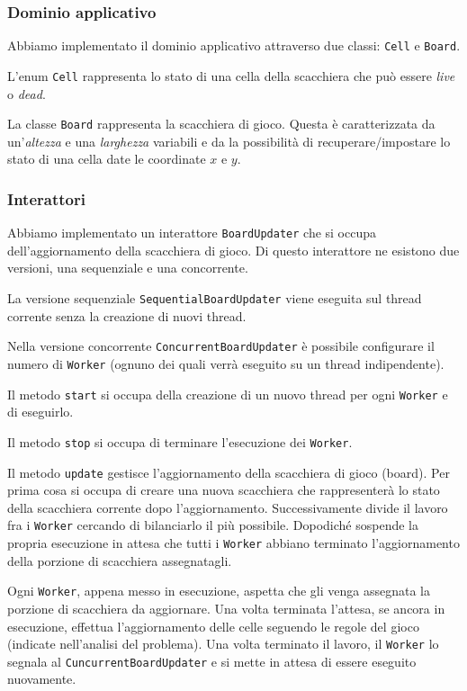 \documentclass[a4paper]{article}
\begin{document}
\subsubsection{Dominio applicativo}\label{dominio-applicativo}

Abbiamo implementato il dominio applicativo attraverso due classi:
\texttt{Cell} e \texttt{Board}.

L'enum \texttt{Cell} rappresenta lo stato di una cella della scacchiera che può essere \emph{live} o \emph{dead}.

La classe \texttt{Board} rappresenta la scacchiera di gioco. Questa è
caratterizzata da un'\emph{altezza} e una \emph{larghezza} variabili e da la possibilità di recuperare/impostare lo stato di una cella date le coordinate $x$ e $y$.

\subsubsection{Interattori}\label{interattori}

Abbiamo implementato un interattore \texttt{BoardUpdater} che si occupa dell'aggiornamento della scacchiera di gioco. Di questo interattore ne esistono due versioni, una sequenziale e una concorrente.

La versione sequenziale \texttt{SequentialBoardUpdater} viene eseguita sul thread corrente senza la creazione di nuovi thread.

Nella versione concorrente \texttt{ConcurrentBoardUpdater} è possibile configurare il numero di \texttt{Worker} (ognuno dei quali verrà
eseguito su un thread indipendente).

Il metodo \texttt{start} si occupa della creazione di un nuovo thread
per ogni \texttt{Worker} e di eseguirlo.

Il metodo \texttt{stop} si occupa di terminare l'esecuzione dei
\texttt{Worker}.

Il metodo \texttt{update} gestisce l'aggiornamento della scacchiera di gioco (board). Per prima cosa si occupa di creare una nuova scacchiera che rappresenterà lo stato della scacchiera corrente dopo
l'aggiornamento. Successivamente divide il lavoro fra i \texttt{Worker} cercando di bilanciarlo il più possibile. Dopodiché sospende la propria esecuzione in attesa che tutti i \texttt{Worker} abbiano terminato
l'aggiornamento della porzione di scacchiera assegnatagli.

Ogni \texttt{Worker}, appena messo in esecuzione, aspetta che gli venga assegnata la porzione di scacchiera da aggiornare. Una volta terminata l'attesa, se ancora in esecuzione, effettua l'aggiornamento delle celle seguendo le regole del gioco (indicate nell'analisi del problema). Una volta terminato il lavoro, il \texttt{Worker} lo segnala al
\texttt{CuncurrentBoardUpdater} e si mette in attesa di essere eseguito
nuovamente.
\end{document}
